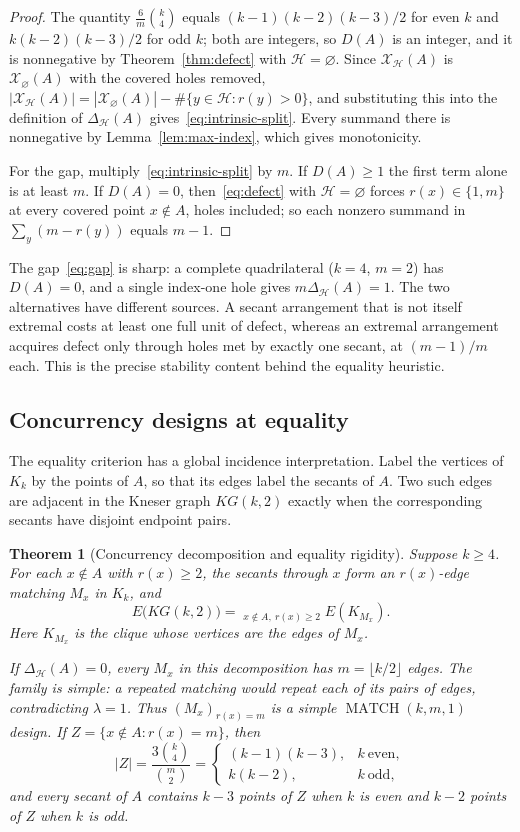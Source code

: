 \documentclass[11pt]{article}
\newtheorem{theorem}{Theorem}[section]
\theoremstyle{definition}
\theoremstyle{remark}
\newcommand{\cH}{\mathcal{H}}
\newcommand{\cX}{\mathcal{X}}
\begin{document}
\begin{proof}
The quantity $\frac6m\binom{k}{4}$ equals $(k-1)(k-2)(k-3)/2$ for even $k$
and $k(k-2)(k-3)/2$ for odd $k$; both are integers, so $D(A)$ is an
integer, and it is nonnegative by Theorem~\ref{thm:defect} with
$\cH=\varnothing$.  Since $\cX_{\cH}(A)$ is $\cX_{\varnothing}(A)$ with the
covered holes removed,
$|\cX_{\cH}(A)|=|\cX_{\varnothing}(A)|-\#\{y\in\cH:r(y)>0\}$, and
substituting this into the definition of $\Delta_{\cH}(A)$
gives~\eqref{eq:intrinsic-split}.  Every summand there is nonnegative by
Lemma~\ref{lem:max-index}, which gives monotonicity.

For the gap, multiply~\eqref{eq:intrinsic-split} by $m$.  If $D(A)\ge1$
the first term alone is at least $m$.  If $D(A)=0$, then~\eqref{eq:defect}
with $\cH=\varnothing$ forces $r(x)\in\{1,m\}$ at every covered point
$x\notin A$, holes included; so each nonzero summand in
$\sum_{y}(m-r(y))$ equals $m-1$.
\end{proof}

The gap~\eqref{eq:gap} is sharp: a complete quadrilateral ($k=4$, $m=2$)
has $D(A)=0$, and a single index-one hole gives $m\Delta_{\cH}(A)=1$.
The two alternatives have different sources.  A secant arrangement that is
not itself extremal costs at least one full unit of defect, whereas an
extremal arrangement acquires defect only through holes met by exactly one
secant, at $(m-1)/m$ each.  This is the precise stability content behind
the equality heuristic.

\subsection{Concurrency designs at equality}
\label{subsec:matching-design}

The equality criterion has a global incidence interpretation.  Label the
vertices of $K_k$ by the points of $A$, so that its edges label the secants
of $A$.  Two such edges are adjacent in the Kneser graph $KG(k,2)$ exactly
when the corresponding secants have disjoint endpoint pairs.

\begin{theorem}[Concurrency decomposition and equality rigidity]
\label{thm:matching-design}
Suppose $k\ge4$.
For each $x\notin A$ with $r(x)\ge2$, the secants through $x$ form an
$r(x)$-edge matching $M_x$ in $K_k$, and
\[
 E\bigl(KG(k,2)\bigr)
   =\mathop{\dot\bigcup}_{x\notin A,\ r(x)\ge2} E(K_{M_x}).
\]
Here $K_{M_x}$ is the clique whose vertices are the edges of $M_x$.

If $\Delta_{\cH}(A)=0$, every $M_x$ in this decomposition has
$m=\lfloor k/2\rfloor$ edges.  The family is simple: a repeated matching
would repeat each of its pairs of edges, contradicting $\lambda=1$.  Thus
$(M_x)_{r(x)=m}$ is a simple $\operatorname{MATCH}(k,m,1)$ design.  If
$Z=\{x\notin A:r(x)=m\}$, then
\[
 |Z|=\frac{3\binom{k}{4}}{\binom{m}{2}}
 =\begin{cases}
   (k-1)(k-3),&k\ \text{even},\\
   k(k-2),&k\ \text{odd},
  \end{cases}
\]
and every secant of $A$ contains $k-3$ points of $Z$ when $k$ is even and
$k-2$ points of $Z$ when $k$ is odd.
\end{theorem}
\end{document}
